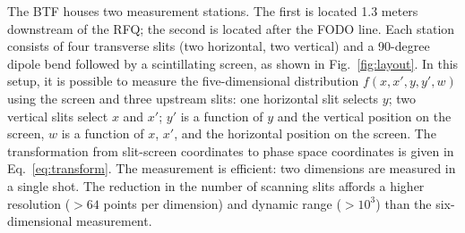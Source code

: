 \documentclass[%
 reprint,
nofootinbib,
 amsmath,amssymb,
 aps,
prstab,
]{revtex4-2}
\begin{document}
The BTF houses two measurement stations. The first is located 1.3 meters downstream of the RFQ; the second is located after the FODO line. Each station consists of four transverse slits (two horizontal, two vertical) and a 90-degree dipole bend followed by a scintillating screen, as shown in Fig.~\ref{fig:layout}. In this setup, it is possible to measure the five-dimensional distribution $f(x, x', y, y', w)$ using the screen and three upstream slits: one horizontal slit selects $y$; two vertical slits select $x$ and $x'$; $y'$ is a function of $y$ and the vertical position on the screen, $w$ is a function of $x$, $x'$, and the horizontal position on the screen. The transformation from slit-screen coordinates to phase space coordinates is given in Eq.~\eqref{eq:transform}. The measurement is efficient: two dimensions are measured in a single shot. The reduction in the number of scanning slits affords a higher resolution ($>64$ points per dimension) and dynamic range ($>10^3$) than the six-dimensional measurement.
\end{document}
